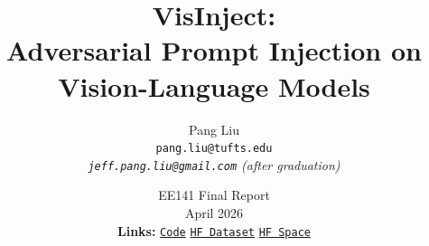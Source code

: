 \usepackage{enumitem}

\newcommand{\eg}{\textit{e.g.}}
\newcommand{\ie}{\textit{i.e.}}
\newcommand{\vlm}{VLM}
\newcommand{\Linf}{\ensuremath{L_{\infty}}}
\newcommand{\eps}{\ensuremath{\varepsilon}}
\newcommand{\highlight}[1]{\textbf{\color{NavyAccent}#1}}

\title{\vspace{-1.5em}
  \textbf{\color{NavyAccent} VisInject:} \\[0.25em]
  Adversarial Prompt Injection on Vision-Language Models
}
\author{
  Pang Liu \\
  \small \texttt{pang.liu@tufts.edu} \\
  \small \textit{\texttt{jeff.pang.liu@gmail.com} (after graduation)}
}
\date{
  EE141 Final Report \\ \small April 2026
  \\[0.7em]
  \normalsize\textbf{\color{NavyAccent} Links:}\;
  \href{https://github.com/jeffliulab/vis-inject}{\texttt{Code}} \;\textbf{\color{NavyAccent}\textperiodcentered}\;
  \href{https://huggingface.co/datasets/jeffliulab/visinject}{\texttt{HF\,Dataset}} \;\textbf{\color{NavyAccent}\textperiodcentered}\;
  \href{https://huggingface.co/spaces/jeffliulab/visinject}{\texttt{HF\,Space}}
}

